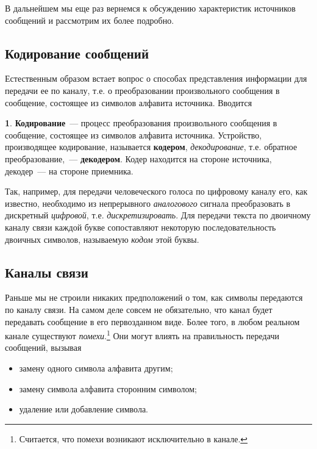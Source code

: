 \documentclass[12pt,a4paper,openright]{book}
\theoremstyle{definition}
\newtheorem{definition}{\textls[150]{Определение}}[chapter]
\numberwithin{equation}{chapter}
\begin{document}
	В дальнейшем мы еще раз вернемся к обсуждению характеристик источников сообщений и рассмотрим их более подробно.




	\subsection{Кодирование сообщений}

	Естественным образом встает вопрос о способах представления информации для передачи ее по каналу, т.е. о преобразовании произвольного сообщения в сообщение, состоящее из символов алфавита источника. Вводится
	\begin{definition}
		\textbf{Кодирование}~--- процесс преобразования произвольного сообщения в сообщение, состоящее из символов алфавита источника. Устройство, производящее кодирование, называется \textbf{кодером}, \textit{декодирование}, т.е. обратное преобразование,~--- \textbf{декодером}. Кодер находится на стороне источника, декодер~--- на стороне приемника.
	\end{definition}

	Так, например, для передачи человеческого голоса по цифровому каналу его, как известно, необходимо из непрерывного \textit{аналогового} сигнала преобразовать в дискретный \textit{цифровой}, т.е. \textit{дискретизировать}. Для передачи текста по двоичному каналу связи каждой букве сопоставляют некоторую последовательность двоичных символов, называемую \textit{кодом} этой буквы.




	\subsection{Каналы связи \label{ss:noise}}

	Раньше мы не строили никаких предположений о том, как символы передаются по каналу связи. На самом деле совсем не обязательно, что канал будет передавать сообщение в его первозданном виде. Более того, в любом реальном канале существуют \textit{помехи}.\footnote{Считается, что помехи возникают исключительно в канале.} Они могут влиять на правильность передачи сообщений, вызывая
	\begin{itemize}
		\item замену одного символа алфавита другим;
		\item замену символа алфавита сторонним символом;
		\item удаление или добавление символа.
	\end{itemize}
\end{document}
